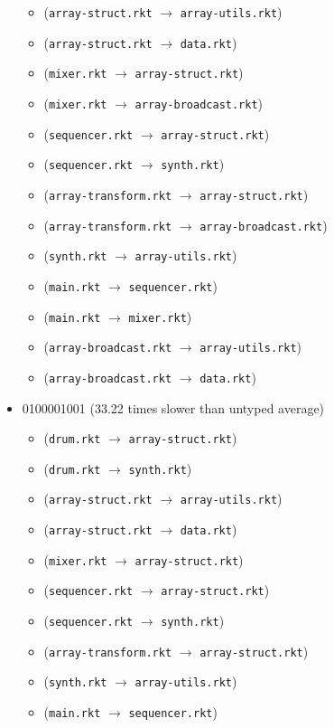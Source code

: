 \documentclass{article}
\newcommand{\mono}[1]{\texttt{#1}}
\begin{document}
\begin{itemize}
\begin{itemize}
  \item (\mono{array-struct.rkt} $\rightarrow$ \mono{array-utils.rkt})
  \item (\mono{array-struct.rkt} $\rightarrow$ \mono{data.rkt})
  \item (\mono{mixer.rkt} $\rightarrow$ \mono{array-struct.rkt})
  \item (\mono{mixer.rkt} $\rightarrow$ \mono{array-broadcast.rkt})
  \item (\mono{sequencer.rkt} $\rightarrow$ \mono{array-struct.rkt})
  \item (\mono{sequencer.rkt} $\rightarrow$ \mono{synth.rkt})
  \item (\mono{array-transform.rkt} $\rightarrow$ \mono{array-struct.rkt})
  \item (\mono{array-transform.rkt} $\rightarrow$ \mono{array-broadcast.rkt})
  \item (\mono{synth.rkt} $\rightarrow$ \mono{array-utils.rkt})
  \item (\mono{main.rkt} $\rightarrow$ \mono{sequencer.rkt})
  \item (\mono{main.rkt} $\rightarrow$ \mono{mixer.rkt})
  \item (\mono{array-broadcast.rkt} $\rightarrow$ \mono{array-utils.rkt})
  \item (\mono{array-broadcast.rkt} $\rightarrow$ \mono{data.rkt})
  \end{itemize}
\item 0100001001 (33.22 times slower than untyped average)
  \begin{itemize}
  \item (\mono{drum.rkt} $\rightarrow$ \mono{array-struct.rkt})
  \item (\mono{drum.rkt} $\rightarrow$ \mono{synth.rkt})
  \item (\mono{array-struct.rkt} $\rightarrow$ \mono{array-utils.rkt})
  \item (\mono{array-struct.rkt} $\rightarrow$ \mono{data.rkt})
  \item (\mono{mixer.rkt} $\rightarrow$ \mono{array-struct.rkt})
  \item (\mono{sequencer.rkt} $\rightarrow$ \mono{array-struct.rkt})
  \item (\mono{sequencer.rkt} $\rightarrow$ \mono{synth.rkt})
  \item (\mono{array-transform.rkt} $\rightarrow$ \mono{array-struct.rkt})
  \item (\mono{synth.rkt} $\rightarrow$ \mono{array-utils.rkt})
  \item (\mono{main.rkt} $\rightarrow$ \mono{sequencer.rkt})

\end{itemize}
\end{itemize}
\end{document}
